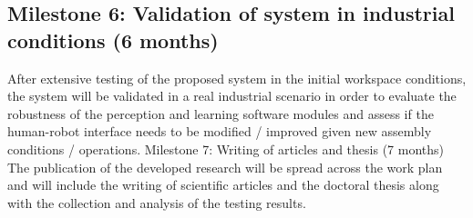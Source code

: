 \subsection{Milestone 6: Validation of system in industrial conditions (6 months)}

After extensive testing of the proposed system in the initial workspace conditions, the system will be validated in a real industrial scenario in order to evaluate the robustness of the perception and learning software modules and assess if the human-robot interface needs to be modified / improved given new assembly conditions / operations. Milestone 7: Writing of articles and thesis (7 months) The publication of the developed research will be spread across the work plan and will include the writing of scientific articles and the doctoral thesis along with the collection and analysis of the testing results.
